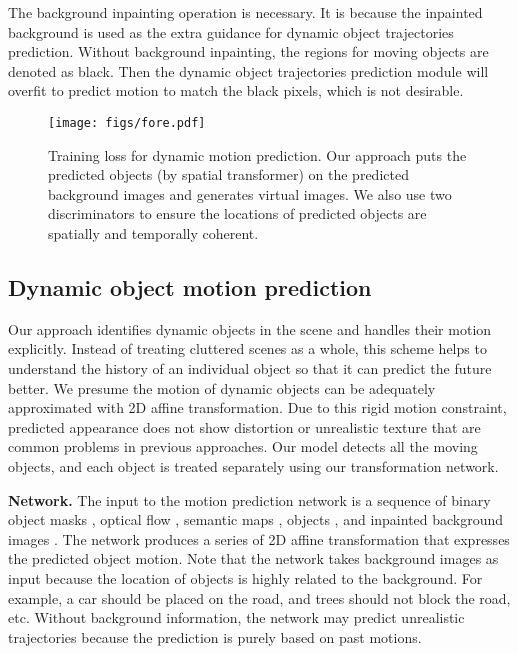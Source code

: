\documentclass[10pt,twocolumn,letterpaper]{article}
\begin{document}
The background inpainting operation is necessary. It is because the inpainted background is used as the extra guidance for dynamic object trajectories prediction. Without background inpainting, the regions for moving objects are denoted as black. Then the dynamic object trajectories prediction module will overfit to predict motion to match the black pixels, which is not desirable.



\begin{figure}[t!]
\centering
\hspace{-2mm}
\texttt{[image: figs/fore.pdf]}
\vspace{1mm}
\caption{
Training loss for dynamic motion prediction. Our approach puts the predicted objects (by spatial transformer) on the predicted background images and generates virtual images. We also use two discriminators to ensure the locations of predicted objects are spatially and temporally coherent.
}
\label{fig:fore}
\end{figure}

\subsection{Dynamic object motion prediction}
Our approach identifies dynamic objects in the scene and handles their motion explicitly. Instead of treating cluttered scenes as a whole, this scheme helps to understand the history of an individual object so that it can predict the future better. We presume the motion of dynamic objects can be adequately approximated with 2D affine transformation. Due to this rigid motion constraint, predicted appearance does not show distortion or unrealistic texture that are common problems in previous approaches. Our model detects all the moving objects, and each object is treated separately using our transformation network.

\vspace{2mm}
\noindent\textbf{Network.}
The input to the motion prediction network is a sequence of binary object masks , optical flow , semantic maps , objects , and inpainted background images . The network produces a series of 2D affine transformation  that expresses the predicted object motion. Note that the network takes background images as input because the location of objects is highly related to the background. For example, a car should be placed on the road, and trees should not block the road, etc. Without background information, the network may predict unrealistic trajectories because the prediction is purely based on past motions.
\end{document}
